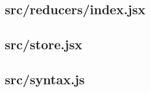 \subsection{src/reducers/index.jsx}
\label{app:client_src_reducers_index_jsx}

\subsection{src/store.jsx}
\label{app:client_src_store_jsx}

\subsection{src/syntax.js}
\label{app:client_src_syntax_js}

